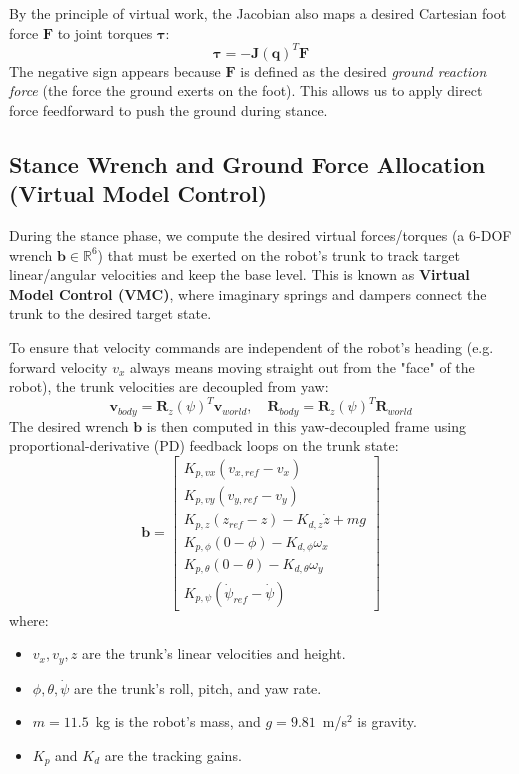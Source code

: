 \documentclass[11pt,a4paper]{article}
\begin{document}
By the principle of virtual work, the Jacobian also maps a desired Cartesian foot force $\mathbf{F}$ to joint torques $\mathbf{\tau}$:
\begin{equation}
\mathbf{\tau} = -\mathbf{J}(\mathbf{q})^T \mathbf{F}
\end{equation}
The negative sign appears because $\mathbf{F}$ is defined as the desired \textit{ground reaction force} (the force the ground exerts on the foot). This allows us to apply direct force feedforward to push the ground during stance.

\subsection{Stance Wrench and Ground Force Allocation (Virtual Model Control)}
During the stance phase, we compute the desired virtual forces/torques (a 6-DOF wrench $\mathbf{b} \in \mathbb{R}^6$) that must be exerted on the robot's trunk to track target linear/angular velocities and keep the base level. This is known as \textbf{Virtual Model Control (VMC)}, where imaginary springs and dampers connect the trunk to the desired target state.

To ensure that velocity commands are independent of the robot's heading (e.g. forward velocity $v_x$ always means moving straight out from the "face" of the robot), the trunk velocities are decoupled from yaw:
\begin{equation}
\mathbf{v}_{body} = \mathbf{R}_z(\psi)^T \mathbf{v}_{world}, \quad \mathbf{R}_{body} = \mathbf{R}_z(\psi)^T \mathbf{R}_{world}
\end{equation}
The desired wrench $\mathbf{b}$ is then computed in this yaw-decoupled frame using proportional-derivative (PD) feedback loops on the trunk state:
\begin{equation}
\mathbf{b} = \begin{bmatrix}
K_{p,vx} (v_{x,ref} - v_x) \\
K_{p,vy} (v_{y,ref} - v_y) \\
K_{p,z} (z_{ref} - z) - K_{d,z} \dot{z} + m g \\
K_{p,\phi} (0 - \phi) - K_{d,\phi} \omega_x \\
K_{p,\theta} (0 - \theta) - K_{d,\theta} \omega_y \\
K_{p,\psi} (\dot{\psi}_{ref} - \dot{\psi})
\end{bmatrix}
\end{equation}
where:
\begin{itemize}
    \item $v_x, v_y, z$ are the trunk's linear velocities and height.
    \item $\phi, \theta, \dot{\psi}$ are the trunk's roll, pitch, and yaw rate.
    \item $m = 11.5$~kg is the robot's mass, and $g = 9.81$~m/s$^2$ is gravity.
    \item $K_p$ and $K_d$ are the tracking gains.
\end{itemize}
\end{document}
